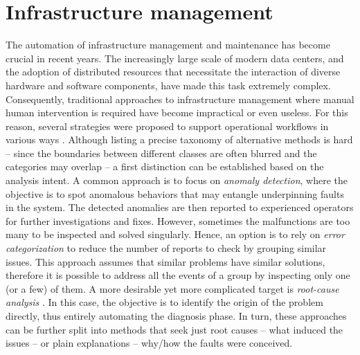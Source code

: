 \chapter{Infrastructure management} \label{ch:opint}
The automation of infrastructure management and maintenance has become crucial in recent years. 
The increasingly large scale of modern data centers, and the adoption of distributed resources that necessitate the interaction of diverse hardware and software components, have made this task extremely complex. Consequently, traditional approaches to infrastructure management where manual human intervention is required have become impractical or even useless. 
For this reason, several strategies were proposed to support operational workflows in various ways \cite{opint2020, opint2022, decker2020powerquality, diotalevi2019elk, padolski}.
Although listing a precise taxonomy of alternative methods is hard -- since the boundaries between different classes are often blurred and the categories may overlap -- a first distinction can be established based on the analysis intent.
A common approach is to focus on \textit{anomaly detection}, where the objective is to spot anomalous behaviors that may entangle underpinning faults in the system. The detected anomalies are then reported to experienced operators for further investigations and fixes.
However, sometimes the malfunctions are too many to be inspected and solved singularly. Hence, an option is to rely on \textit{error categorization} to reduce the number of reports to check by grouping similar issues. This approach assumes that similar problems have similar solutions, therefore it is possible to address all the events of a group by inspecting only one (or a few) of them.
A more desirable yet more complicated target is \textit{root-cause analysis} \cite{sole2017survey}. In this case, the objective is to identify the origin of the problem directly, thus entirely automating the diagnosis phase.
In turn, these approaches can be further split into methods that seek just root causes -- what induced the issues -- or plain explanations -- why/how the faults were conceived.


